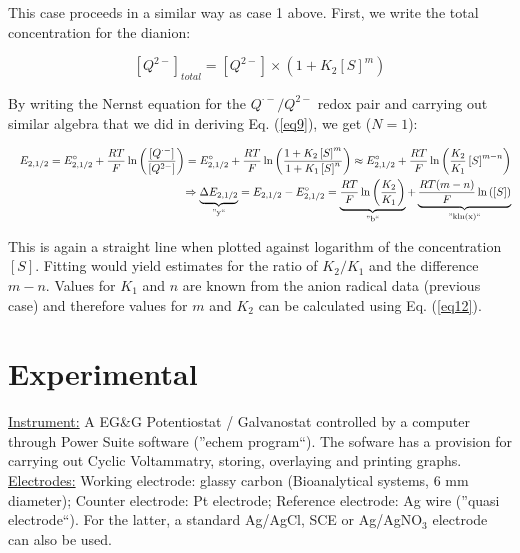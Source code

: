 \documentclass[byrevtex,amssymb,aps,pra,floatfix,letterpaper]{revtex4}
\begin{document}
\noindent
This case proceeds in a similar way as case 1 above. First, we write the total concentration for the dianion:

\begin{equation}
\left[Q^{2-}\right]_{total} = \left[Q^{2-}\right] \times \left(1 + K_2\left[S\right]^m\right)
\label{eq11}
\end{equation}

\noindent
By writing the Nernst equation for the $Q^{\cdot-}/Q^{2-}$ redox pair and carrying out similar algebra that we did in deriving Eq. (\ref{eq9}), we get ($N = 1$):

\begin{eqnarray}
& & E_{2,1/2} = E_{2,1/2}^\circ + \frac{RT}{F}\ln\left(\frac{\left[Q^{\cdot-}\right]}{\left[Q^{2-}\right]}\right)
 = E_{2,1/2}^\circ + \frac{RT}{F}\ln\left(\frac{1 + K_2\left[S\right]^m}{1 + K_1\left[S\right]^n}\right)
 \approx E_{2,1/2}^\circ + \frac{RT}{F}\ln\left(\frac{K_2}{K_1}\left[S\right]^{m-n}\right)\\
\nonumber
& & \Rightarrow \underbrace{\Delta E_{2,1/2}}_{\textnormal{''y``}} = E_{2,1/2} - E_{2,1/2}^\circ = \underbrace{\frac{RT}{F}\ln\left(\frac{K_2}{K_1}\right)}_{\textnormal{''b``}} + \underbrace{\frac{RT(m - n)}{F}\ln\left(\left[S\right]\right)}_{\textnormal{''kln(x)``}}
\label{eq12}
\end{eqnarray}

\noindent
This is again a straight line when plotted against logarithm of the concentration $\left[S\right]$. Fitting would yield estimates for the ratio of $K_2 / K_1$ and the difference $m - n$. Values for $K_1$ and $n$ are known from the anion radical data (previous case) and therefore values for $m$ and $K_2$ can be calculated using Eq. (\ref{eq12}).

\section{Experimental}

\noindent
\underline{Instrument:} A EG\&G Potentiostat / Galvanostat controlled by a computer through Power Suite software (''echem program``). The sofware has a provision for carrying out Cyclic Voltammatry, storing, overlaying and printing graphs.\\

\noindent
\underline{Electrodes:} Working electrode: glassy carbon (Bioanalytical systems, 6 mm diameter); Counter electrode: Pt electrode; Reference electrode: Ag wire (''quasi electrode``). For the latter, a standard Ag/AgCl, SCE or Ag/AgNO$_3$ electrode can also be used.\\
\end{document}
